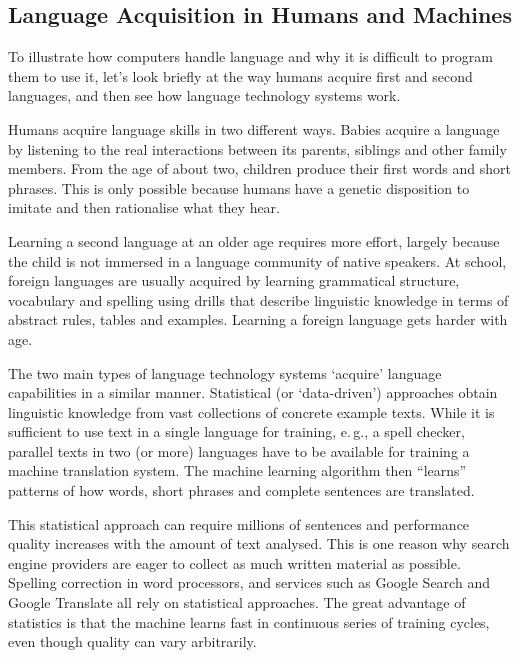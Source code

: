 \begin{multicols}{2}
\subsection{Language Acquisition in Humans and Machines}
To illustrate how computers handle language and why it is difficult to program them to use it, let’s look briefly at the way humans acquire first and second languages, and then see how language technology systems work. 

Humans acquire language skills in two different ways. Babies acquire a language by listening to the real interactions between its parents, siblings and other family members. From the age of about two, children produce their first words and short phrases. This is only possible because humans have a genetic disposition to imitate and then rationalise what they hear. 

Learning a second language at an older age requires more effort, largely because the child is not immersed in a language community of native speakers. At school, foreign languages are usually acquired by learning grammatical structure, vocabulary and spelling using drills that describe linguistic knowledge in terms of abstract rules, tables and examples. Learning a foreign language gets harder with age.


The two main types of language technology systems ‘acquire’ language capabilities in a similar manner. Statistical (or ‘data-driven’) approaches obtain linguistic knowledge from vast collections of concrete example texts. While it is sufficient to use text in a single language for training, e.\,g., a spell checker, parallel texts in two (or more) languages have to be available for training a machine translation system. The machine learning algorithm then “learns” patterns of how words, short phrases and complete sentences are translated. 

This statistical approach can require millions of sentences and performance quality increases with the amount of text analysed. This is one reason why search engine providers are eager to collect as much written material as possible. Spelling correction in word processors, and services such as Google Search and Google Translate all rely on statistical approaches. The great advantage of statistics is that the machine learns fast in continuous series of training cycles, even though quality can vary arbitrarily.


\end{multicols}
